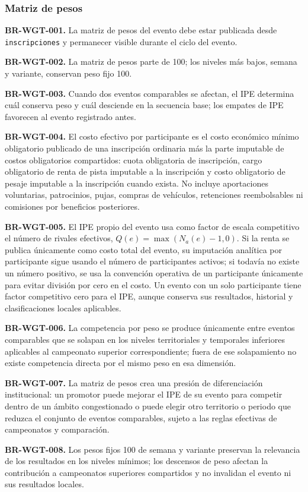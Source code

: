 \documentclass[10pt,letterpaper]{article}
\begin{document}
\subsubsection{Matriz de pesos}
\noindent\textbf{BR-WGT-001.} La matriz de pesos del evento debe estar publicada desde \texttt{inscripciones} y permanecer visible durante el ciclo del evento.\par
\noindent\textbf{BR-WGT-002.} La matriz de pesos parte de 100; los niveles más bajos, semana y variante, conservan peso fijo 100.\par
\noindent\textbf{BR-WGT-003.} Cuando dos eventos comparables se afectan, el IPE determina cuál conserva peso y cuál desciende en la secuencia base; los empates de IPE favorecen al evento registrado antes.\par
\noindent\textbf{BR-WGT-004.} El costo efectivo por participante es el costo económico mínimo obligatorio publicado de una inscripción ordinaria más la parte imputable de costos obligatorios compartidos: cuota obligatoria de inscripción, cargo obligatorio de renta de pista imputable a la inscripción y costo obligatorio de pesaje imputable a la inscripción cuando exista. No incluye aportaciones voluntarias, patrocinios, pujas, compras de vehículos, retenciones reembolsables ni comisiones por beneficios posteriores.\par
\noindent\textbf{BR-WGT-005.} El IPE propio del evento usa como factor de escala competitivo el número de rivales efectivos, $Q(e)=\max(N_a(e)-1,0)$. Si la renta se publica únicamente como costo total del evento, su imputación analítica por participante sigue usando el número de participantes activos; si todavía no existe un número positivo, se usa la convención operativa de un participante únicamente para evitar división por cero en el costo. Un evento con un solo participante tiene factor competitivo cero para el IPE, aunque conserva sus resultados, historial y clasificaciones locales aplicables.\par
\noindent\textbf{BR-WGT-006.} La competencia por peso se produce únicamente entre eventos comparables que se solapan en los niveles territoriales y temporales inferiores aplicables al campeonato superior correspondiente; fuera de ese solapamiento no existe competencia directa por el mismo peso en esa dimensión.\par
\noindent\textbf{BR-WGT-007.} La matriz de pesos crea una presión de diferenciación institucional: un promotor puede mejorar el IPE de su evento para competir dentro de un ámbito congestionado o puede elegir otro territorio o periodo que reduzca el conjunto de eventos comparables, sujeto a las reglas efectivas de campeonatos y comparación.\par
\noindent\textbf{BR-WGT-008.} Los pesos fijos 100 de semana y variante preservan la relevancia de los resultados en los niveles mínimos; los descensos de peso afectan la contribución a campeonatos superiores compartidos y no invalidan el evento ni sus resultados locales.\par
\end{document}
